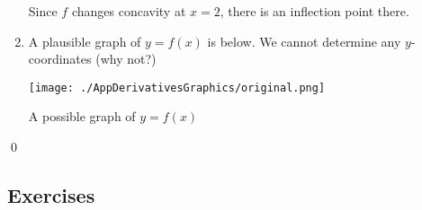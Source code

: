 \documentclass{ximera}
\begin{document}
\begin{example}
\begin{enumerate}
Since $f$ changes concavity at $x=2$, there is an inflection point there.

\medskip

\item   A plausible graph of $y = f(x)$  is below.  We cannot determine any $y$-coordinates (why not?)


\begin{center}

 \texttt{[image: ./AppDerivativesGraphics/original.png]}
 
 A possible graph of $y = f(x)$
 
 \end{center}


\end{enumerate}

\hfill \qed

\end{example}








\newpage

\subsection{Exercises}

\closegraphsfile
\end{document}

